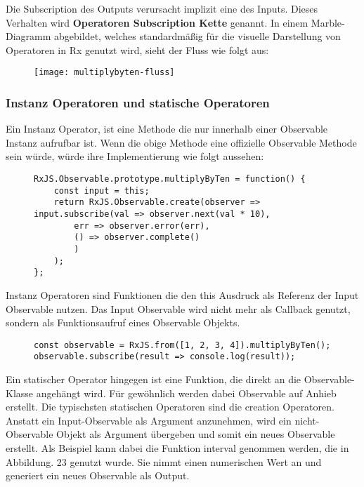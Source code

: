 \noindent
Die Subscription des Outputs verursacht implizit eine des Inputs. Dieses Verhalten wird \textbf{Operatoren Subscription Kette} genannt. In einem Marble-Diagramm abgebildet, welches standardmäßig für die visuelle Darstellung von Operatoren in Rx genutzt wird, sieht der Fluss wie folgt aus:

\begin{figure}[H]
\centering
\texttt{[image: multiplybyten-fluss]}
\end{figure}

\subsubsection{Instanz Operatoren und statische Operatoren}
Ein Instanz Operator, ist eine Methode die nur innerhalb einer Observable Instanz aufrufbar ist. Wenn die obige Methode eine offizielle Observable Methode sein würde, würde ihre Implementierung wie folgt aussehen:

\begin{figure}[H]
\begin{lstlisting}[basicstyle=\small]
RxJS.Observable.prototype.multiplyByTen = function() {
    const input = this;
    return RxJS.Observable.create(observer => input.subscribe(val => observer.next(val * 10),
        err => observer.error(err),
        () => observer.complete()
        )
    );
};
\end{lstlisting}
\end{figure}

\noindent
Instanz Operatoren sind Funktionen die den this Ausdruck als Referenz der Input Observable nutzen. Das Input Observable wird nicht mehr als Callback genutzt, sondern als Funktionsaufruf eines Observable Objekts.

\begin{figure}[H]
\begin{lstlisting}[basicstyle=\small]
const observable = RxJS.from([1, 2, 3, 4]).multiplyByTen();
observable.subscribe(result => console.log(result));
\end{lstlisting}
\end{figure}

\noindent
Ein statischer Operator hingegen ist eine Funktion, die direkt an die Observable-Klasse angehängt wird. Für gewöhnlich werden dabei Observable auf Anhieb erstellt. Die typischsten statischen Operatoren sind die creation Operatoren. Anstatt ein Input-Observable als Argument anzunehmen, wird ein nicht-Observable Objekt als Argument übergeben und somit ein neues Observable erstellt. Als Beispiel kann dabei die Funktion interval genommen werden, die in Abbildung. 23 genutzt wurde. Sie nimmt einen numerischen Wert an und generiert ein neues Observable als Output.\\

